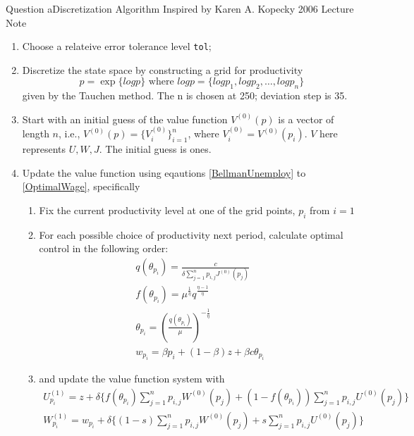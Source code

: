 \documentclass{beamer}
\begin{document}
\begin{frame}[allowframebreaks]{Question a}{Discretization Algorithm}
    Inspired by Karen A. Kopecky 2006 Lecture Note
    \begin{enumerate}
        \item Choose a relateive error tolerance level \texttt{tol};
        \item Discretize the state space by constructing a grid for productivity \[
            p = \exp\{logp\}
            \text{\ where\ } logp = \{logp_1, logp_2, \ldots, logp_n\} \] given by the Tauchen method.
            The n is chosen at 250; deviation step is 35. 
        \item Start with an initial guess of the value function \(V^{(0)}(p)\) is a vector of length \(n\), i.e., \(V^{(0)}(p) = \{V^{(0)}_i\}_{i=1}^n\), where \(V^{(0)}_i = V^{(0)}(p_i)\).
            \(V\) here represents \(U, W, J\). The initial guess is ones.
        \framebreak
        \label{update}
        \item Update the value function using eqautions \ref{BellmanUnemploy} to \ref{OptimalWage}, specifically
            \begin{enumerate}
                \item Fix the current productivity level at one of the grid points, \(p_i\) from \(i=1\)
                \item For each possible choice of productivity next period, calculate optimal control in the following order:
                \begin{gather*}
                    q(\theta_{p_i}) = \frac{c}{\delta \sum_{j=1}^{n}p_{i,j}J^{(0)}(p_j)}\\
                    f(\theta_{p_i}) = \mu^\frac{1}{\eta} q^\frac{\eta-1}{\eta}\\
                    \theta_{p_i} = (\frac{q(\theta_{p_i})}{\mu})^{-\frac{1}{\eta}}\\
                    w_{p_i} = \beta p_i + (1-\beta)z + \beta c \theta_{p_i}
                \end{gather*}
                \item and update the value function system with 
                \framebreak
                \begin{gather*}
                    U^{(1)}_{p_i} = z + \delta\{f(\theta_{p_i})\sum_{j=1}^{n}p_{i,j}W^{(0)}(p_j) + (1-f(\theta_{p_i}))\sum_{j=1}^{n}p_{i,j}U^{(0)}(p_j)\}\\
                    W^{(1)}_{p_i} = w_{p_i} + \delta\{(1-s)\sum_{j=1}^{n}p_{i,j}W^{(0)}(p_j) + s\sum_{j=1}^{n}p_{i,j}U^{(0)}(p_j)\}\\

\end{gather*}
\end{enumerate}
\end{enumerate}
\end{frame}
\end{document}
